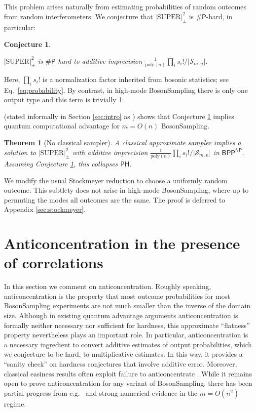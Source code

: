 \documentclass[11pt]{article}
\theoremstyle{plain}
\theoremstyle{plain}
\theoremstyle{plain}
\newtheorem{thm}{Theorem}
\theoremstyle{plain}
\theoremstyle{plain}
\theoremstyle{plain}
\theoremstyle{plain}
\theoremstyle{remark}
\theoremstyle{remark}
\theoremstyle{plain}
\theoremstyle{plain}
\newtheorem{conj}{Conjecture}
\theoremstyle{plain}
\theoremstyle{plain}
\newcommand{\superap}{\lvert \mathrm{SUPER}\rvert^2_\pm}
\newcommand{\Smn}{\mathcal{S}_{m,n}}
\newcommand{\sharP}{\#\mathsf{P}}
\newcommand\poly[1]{\mathrm{poly}(#1)}
\begin{document}
This problem arises naturally from estimating probabilities of random outcomes from random interferometers. We conjecture that $\superap$ is $\sharP$-hard, in particular:

\begin{conj}\label{conj:UPEap}

$\superap$ is $\sharP$-hard to additive imprecision $\frac{1}{\poly{n}}\prod_i s_i!/\vert\Smn\vert.$ 
\end{conj}

Here, $\prod_i s_i!$ is a normalization factor inherited from bosonic statistics; see Eq.~\ref{eq:probability}. By contrast, in high-mode BosonSampling there is only one output type and this term is trivially 1.

 (stated informally in Section \ref{sec:intro} as ) shows that Conjecture \ref{conj:UPEap} implies quantum computational advantage for $m=O(n)$ BosonSampling. 

\begin{thm}[No classical sampler]\label{thm:no-sampler}
    A classical approximate sampler implies a solution to $\superap$ with additive imprecision $\frac{1}{\poly{n}}\prod_i s_i!/\vert\Smn\vert$ in $\mathsf{BPP}^\mathsf{NP}. $ Assuming Conjecture \ref{conj:UPEap}, this collapses $\mathsf{PH}$. 
\end{thm}

We modify the usual Stockmeyer reduction to choose a uniformly random outcome. This subtlety does not arise in high-mode BosonSampling, where up to permuting the modes all outcomes are the same. The proof is deferred to Appendix \ref{sec:stockmeyer}.
\vspace{-1em}
\section{Anticoncentration in the presence of correlations}\label{sec:anticonc}

In this section we comment on anticoncentration. Roughly speaking, anticoncentration is the property that most outcome probabilities for most BosonSampling experiments are not much smaller than the inverse of the domain size.
Although in existing quantum advantage arguments anticoncentration is formally neither necessary nor sufficient for hardness, this approximate ``flatness'' property nevertheless plays an important role. In particular, anticoncentration is a necessary ingredient to convert additive estimates of output probabilities, which we conjecture to be hard, to multiplicative estimates. In this way, it provides a ``sanity check'' on hardness conjectures that involve additive error. 
Moreover, classical easiness results often exploit failure to anticoncentrate \cite{harvardXEB, Napp2020}. While it remains open to prove anticoncentration for any variant of BosonSampling, there has been partial progress from e.g.\ \cite{nezami2021permanent} and strong numerical evidence in the $m=O(n^2)$ regime. 
\end{document}
